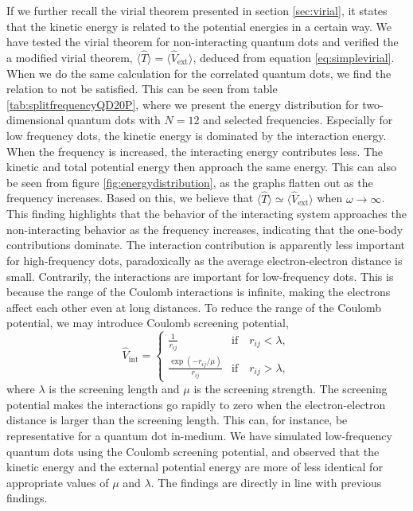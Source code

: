 If we further recall the virial theorem presented in section \ref{sec:virial}, it states that the kinetic energy is related to the potential energies in a certain way. We have tested the virial theorem for non-interacting quantum dots and verified the a modified virial theorem, $\langle\hat{T}\rangle=\langle\hat{V}_{\text{ext}}\rangle$, deduced from equation \eqref{eq:simplevirial}. When we do the same calculation for the correlated quantum dots, we find the relation to not be satisfied. This can be seen from table \eqref{tab:splitfrequencyQD20P}, where we present the energy distribution for two-dimensional quantum dots with $N=12$ and selected frequencies. Especially for low frequency dots, the kinetic energy is dominated by the interaction energy. When the frequency is increased, the interacting energy contributes less. The kinetic and total potential energy then approach the same energy. This can also be seen from figure \eqref{fig:energydistribution}, as the graphs flatten out as the frequency increases. Based on this, we believe that $\langle\hat{T}\rangle\simeq\langle\hat{V}_{\text{ext}}\rangle$ when $\omega\rightarrow\infty$. This finding highlights that the behavior of the interacting system approaches the non-interacting behavior as the frequency increases, indicating that the one-body contributions dominate. The interaction contribution is apparently less important for high-frequency dots, paradoxically as the average electron-electron distance is small. Contrarily, the interactions are important for low-frequency dots. This is because the range of the Coulomb interactions is infinite, making the electrons affect each other even at long distances. To reduce the range of the Coulomb potential, we may introduce Coulomb screening potential,
\begin{equation}
\hat{V}_{\text{int}}=
\begin{cases}
\frac{1}{r_{ij}} & \text{if}\quad r_{ij} < \lambda,\\
\frac{\exp(-r_{ij}/\mu)}{r_{ij}} & \text{if}\quad r_{ij} >\lambda,
\end{cases}
\end{equation}
where $\lambda$ is the screening length and $\mu$ is the screening strength. The screening potential makes the interactions go rapidly to zero when the electron-electron distance is larger than the screening length. This can, for instance, be representative for a quantum dot in-medium. We have simulated low-frequency quantum dots using the Coulomb screening potential, and observed that the kinetic energy and the external potential energy are more of less identical for appropriate values of $\mu$ and $\lambda$. The findings are directly in line with previous findings. 

